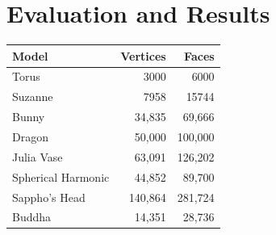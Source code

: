 \documentclass{stdlocal}
\begin{document}
\section{Evaluation and Results} %
\label{sec:evaluation}

\begin{table}
  \centering
  \small
  \renewcommand{\arraystretch}{1.3}
  \begin{tabular}{lrr}
    \hline
    \textbf{Model} & \textbf{Vertices} & \textbf{Faces} \\
    \hline
    \hline
    \rowcolor{mathdefback}
    Torus & 3000 & 6000 \\
    Suzanne & 7958 & 15744 \\
    \rowcolor{mathdefback}
    Bunny & 34,835 & 69,666 \\
    Dragon & 50,000 & 100,000 \\
    \rowcolor{mathdefback}
    Julia Vase & 63,091 & 126,202 \\
    Spherical Harmonic & 44,852 & 89,700 \\
    \rowcolor{mathdefback}
    Sappho's Head & 140,864 & 281,724 \\
    Buddha & 14,351 & 28,736 \\
    \hline
  \end{tabular}
\end{table}
\end{document}
